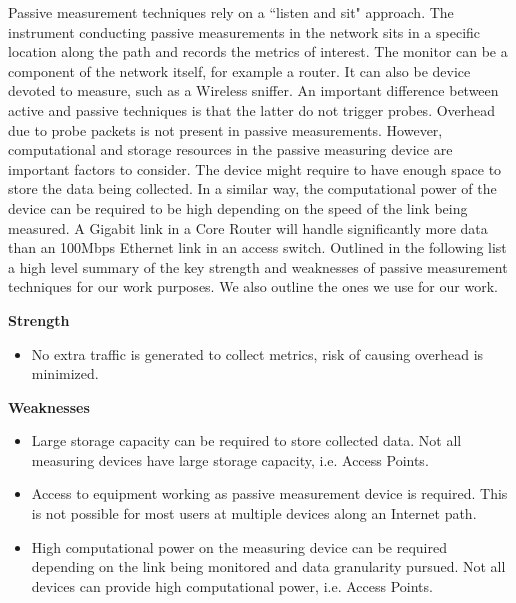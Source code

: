 Passive measurement techniques rely on a ``listen and sit" approach. The instrument conducting passive measurements in the network sits in a specific location along the path and records the metrics of interest. The monitor can be a component of the network itself, for example a router. It can also be device devoted to measure, such as a Wireless sniffer. An important difference between active and passive techniques is that the latter do not trigger probes. Overhead due to probe packets is not present in passive measurements. However, computational and storage resources in the passive measuring device are important factors to consider. The device might require to have enough space to store the data being collected. In a similar way, the computational power of the device can be required to be high depending on the speed of the link being measured. A Gigabit link in a Core Router will handle significantly more data than an 100Mbps Ethernet link in an access switch. 
Outlined in the following list a high level summary of the key strength and weaknesses of passive measurement techniques for our work purposes. We also outline the ones we use for our work.

\textbf{Strength}
\begin{itemize}
	\item No extra traffic is generated to collect metrics, risk of causing overhead is minimized.
\end{itemize}


\textbf{Weaknesses}
\begin{itemize}
	\item Large storage capacity can be required to store collected data. Not all measuring devices have large storage capacity, i.e. Access Points.
	\item Access to equipment working as passive measurement device is required. This is not possible for most users at multiple devices along an Internet path.
	\item High computational power on the measuring device can be required depending on the link being monitored and data granularity pursued. Not all devices can provide high computational power, i.e. Access Points.
\end{itemize}

